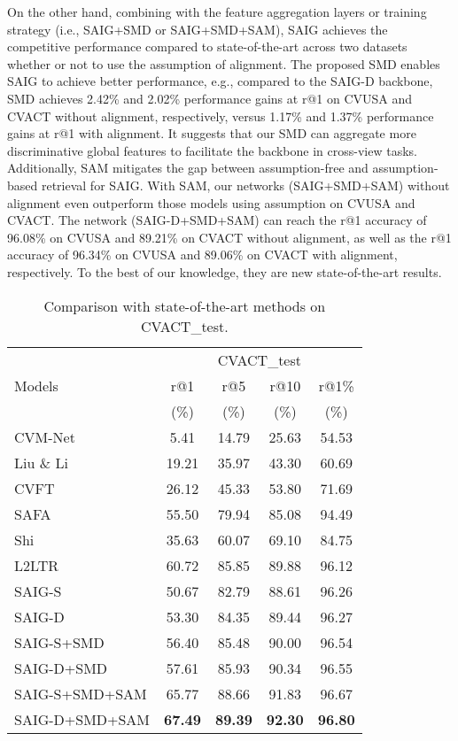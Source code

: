 \documentclass[sn-basic,iicol]{sn-jnl}
\theoremstyle{thmstyletwo}\newtheorem{example}{Example}\newtheorem{remark}{Remark}
\theoremstyle{thmstylethree}\newtheorem{definition}{Definition}
\begin{document}
On the other hand, combining with the feature aggregation layers or training strategy (i.e., SAIG+SMD or SAIG+SMD+SAM), SAIG achieves the competitive performance compared to state-of-the-art across two datasets whether or not to use the assumption of alignment.
The proposed SMD enables SAIG to achieve better performance, e.g., compared to the SAIG-D backbone, SMD achieves 2.42\% and 2.02\% performance gains at r@1 on CVUSA and CVACT without alignment, respectively, versus 1.17\% and 1.37\% performance gains at r@1 with alignment. It suggests that our SMD can aggregate more discriminative global features to facilitate the backbone in cross-view tasks. Additionally, SAM mitigates the gap between assumption-free and assumption-based retrieval for SAIG. With SAM, our networks (SAIG+SMD+SAM) without alignment even outperform those models using assumption on CVUSA and CVACT. The network (SAIG-D+SMD+SAM) can reach the r@1 accuracy of 96.08\% on CVUSA and 89.21\% on CVACT without alignment, as well as the r@1 accuracy of 96.34\% on CVUSA and 89.06\% on CVACT with alignment, respectively. To the best of our knowledge, they are new state-of-the-art results. 






\begin{table}[ht]
\centering
\begin{tabular}{lcccc}
\toprule
\multirow{3}{*}{Models}& \multicolumn{4}{c}{CVACT\_test}\\ \cmidrule(lr){2-5} 
~ &  r@1 & r@5& r@10& r@1\% \\ 
~ &  (\%) & (\%) & (\%) & (\%) \\ \midrule
CVM-Net & 5.41 & 14.79 & 25.63 & 54.53 \\
Liu \& Li & 19.21 & 35.97 & 43.30 & 60.69 \\
CVFT & 26.12 & 45.33 & 53.80 & 71.69 \\
SAFA & 55.50 & 79.94 & 85.08 & 94.49 \\
Shi & 35.63 & 60.07 & 69.10 & 84.75 \\
L2LTR & 60.72 & 85.85 & 89.88 & 96.12 \\
\midrule
SAIG-S & 50.67 & 82.79 & 88.61 & 96.26 \\
SAIG-D & 53.30 & 84.35 & 89.44 & 96.27 \\
\midrule
SAIG-S+SMD & 56.40 & 85.48 & 90.00 & 96.54 \\
SAIG-D+SMD & 57.61 & 85.93 & 90.34 & 96.55 \\
SAIG-S+SMD+SAM & 65.77 & 88.66 & 91.83 & 96.67 \\
SAIG-D+SMD+SAM & \textbf{67.49} & \textbf{89.39} & \textbf{92.30} & \textbf{96.80} \\

\bottomrule
\end{tabular}
\caption{Comparison with state-of-the-art methods on CVACT\_test.  }
\vspace{-3pt}
\label{CVACT_test}
\end{table}
\end{document}
